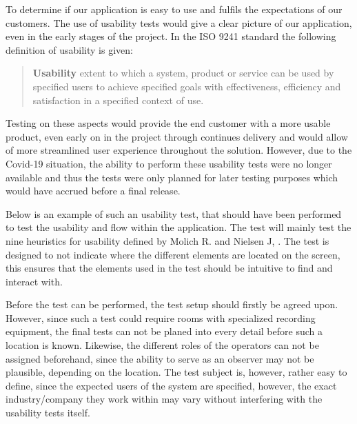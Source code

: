 To determine if our application is easy to use and fulfils the expectations of our customers.
The use of usability tests would give a clear picture of our application, even in the early stages of the project.
In the ISO 9241 standard the following definition of usability is given:
\begin{quote}
    \textbf{Usability} extent to which a system, product or service can be used by specified users to achieve specified goals with effectiveness, efficiency and satisfaction in a specified context of use. \cite{ISO9241}
\end{quote}
Testing on these aspects would provide the end customer with a more usable product, even early on in the project through continues delivery and would allow of more streamlined user experience throughout the solution.
However, due to the Covid-19 situation, the ability to perform these usability tests were no longer available and thus the tests were only planned for later testing purposes which would have accrued before a final release.

Below is an example of such an usability test, that should have been performed to test the usability and flow within the application.
The test will mainly test the nine heuristics for usability defined by Molich R. and Nielsen J, \cite{Usability}.
The test is designed to not indicate where the different elements are located on the screen, this ensures that the elements used in the test should be intuitive to find and interact with.

Before the test can be performed, the test setup should firstly be agreed upon.
However, since such a test could require rooms with specialized recording equipment, the final tests can not be planed into every detail before such a location is known.
Likewise, the different roles of the operators can not be assigned beforehand, since the ability to serve as an observer may not be plausible, depending on the location.
The test subject is, however, rather easy to define, since the expected users of the system are specified, however, the exact industry/company they work within may vary without interfering with the usability tests itself.

